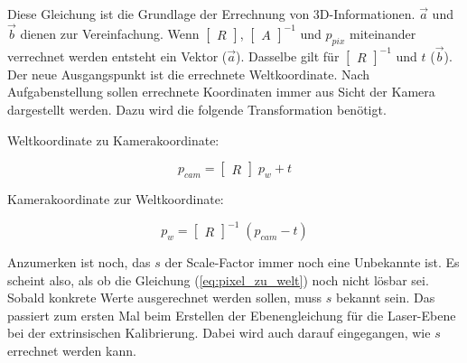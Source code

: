 		Diese Gleichung ist die Grundlage der Errechnung von 3D-Informationen. \( \vec{a} \) und \( \vec{b} \) dienen zur Vereinfachung. Wenn \( \begin{bmatrix} R \end{bmatrix} \), \( \begin{bmatrix} A \end{bmatrix}^{-1} \) und \( p_{pix} \) miteinander verrechnet werden entsteht ein Vektor (\( \vec{a} \)). Dasselbe gilt für \( \begin{bmatrix} R \end{bmatrix}^{-1} \) und \( t \) (\( \vec{b} \)). \newline
		Der neue Ausgangspunkt ist die errechnete Weltkoordinate. Nach Aufgabenstellung sollen errechnete Koordinaten immer aus Sicht der Kamera dargestellt werden. Dazu wird die folgende Transformation benötigt. 
		
		Weltkoordinate zu Kamerakoordinate:
		
		\begin{equation}
			p_{cam} = \begin{bmatrix} R \end{bmatrix} \; p_w + t
			\label{eq:welt_zu_kamera}
		\end{equation}
		
		Kamerakoordinate zur Weltkoordinate:
		
		\begin{equation}
			p_w = \begin{bmatrix} R \end{bmatrix}^{-1} \; (p_{cam} - t)
			\label{eq:kamera_zu_welt}
		\end{equation}
		
		Anzumerken ist noch, das \( s \) der Scale-Factor immer noch eine Unbekannte ist. Es scheint also, als ob die Gleichung (\ref{eq:pixel_zu_welt}) noch nicht lösbar sei. Sobald konkrete Werte ausgerechnet werden sollen, muss \( s \) bekannt sein. Das passiert zum ersten Mal beim Erstellen der Ebenengleichung für die Laser-Ebene bei der extrinsischen Kalibrierung. Dabei wird auch darauf eingegangen, wie \( s \) errechnet werden kann.  

